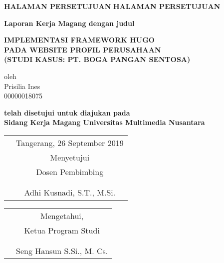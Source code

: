 \begin{center}
    \textbf{HALAMAN PERSETUJUAN}
    \textbf{HALAMAN PERSETUJUAN}
\end{center}

\begin{center}
    
\textbf{Laporan Kerja Magang dengan judul\linebreak[1]}

\textbf{ IMPLEMENTASI FRAMEWORK HUGO \\
    PADA WEBSITE PROFIL PERUSAHAAN \\
    (STUDI KASUS: PT. BOGA PANGAN SENTOSA)}
\end{center}


\begin{center}
oleh\\
Prisilia Ines\\
00000018075\linebreak[2]

\textbf{telah disetujui untuk diajukan pada \\ 
        Sidang Kerja Magang Universitas Multimedia Nusantara\linebreak[2]}
\end{center}

\begin{center}

    \begin{tabular}{p{0cm}c}
        &Tangerang, 26 September 2019\\
        &Menyetujui\\
        &Dosen Pembimbing\\
        &\\
        &\\
        &{Adhi Kusnadi, S.T., M.Si.}
    \end{tabular}

    \begin{tabular}{p{0cm}c}
        &Mengetahui,\\
        &Ketua Program Studi\\
        &\\
        &\\
        &{Seng Hansun S.Si., M. Cs.}
    \end{tabular}
    
\end{center}
